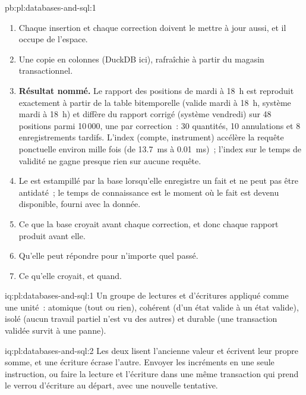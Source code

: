 \begin{solution}{pb:pl:databases-and-sql:1}
\begin{enumerate}
\item Chaque insertion et chaque correction doivent le mettre à jour aussi, et il occupe de l'espace.
\item Une copie en colonnes (DuckDB ici), rafraîchie à partir du magasin transactionnel.
\item \textbf{Résultat nommé.} Le rapport des positions de mardi à 18~h est reproduit exactement à partir de la table bitemporelle (valide mardi à 18~h, système
mardi à 18~h) et diffère du rapport corrigé (système vendredi) sur 48 positions parmi 10\,000, une par correction~: 30 quantités, 10
annulations et 8 enregistrements tardifs. L'index (compte, instrument) accélère la requête ponctuelle environ mille fois (de 13.7~ms à 0.01~ms)~; l'index sur le
temps de validité ne gagne presque rien sur aucune requête.
\item Le  est estampillé par la base lorsqu'elle enregistre un fait et ne peut pas être antidaté~; le temps de connaissance est le moment où le fait est devenu disponible,
fourni avec la donnée.
\item Ce que la base croyait avant chaque correction, et donc chaque rapport produit avant elle.
\item Qu'elle peut répondre pour n'importe quel  passé.
\item Ce qu'elle croyait, et quand.
\end{enumerate}
\end{solution}

\begin{solution}{iq:pl:databases-and-sql:1}
Un groupe de lectures et d'écritures appliqué comme une unité~: atomique (tout ou rien), cohérent (d'un état valide à un état valide), isolé (aucun travail partiel
n'est vu des autres) et durable (une transaction validée survit à une panne).
\end{solution}

\begin{solution}{iq:pl:databases-and-sql:2}
Les deux lisent l'ancienne valeur et écrivent leur propre somme, et une écriture écrase l'autre. Envoyer les incréments en une seule instruction, ou faire la lecture et
l'écriture dans une même transaction qui prend le verrou d'écriture au départ, avec une nouvelle tentative.
\end{solution}

